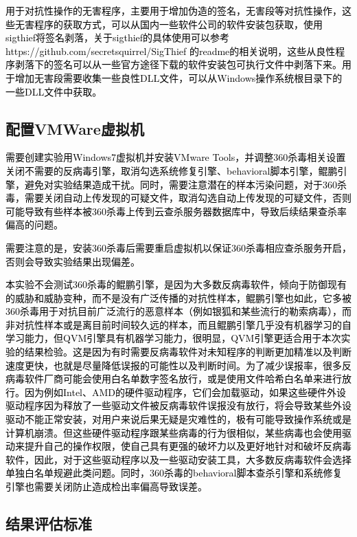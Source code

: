 \textcolor{black}{用于对抗性操作的无害程序，主要用于增加伪造的签名，无害段等对抗性操作，这些无害程序的获取方式，可以从国内一些软件公司的软件安装包获取，使用sigthief将签名剥落，关于sigthief的具体使用可以参考https://github.com/secretsquirrel/SigThief 的readme的相关说明，这些从良性程序剥落下的签名可以从一些官方途径下载的软件安装包可执行文件中剥落下来。用于增加无害段需要收集一些良性DLL文件，可以从Windows操作系统根目录下的一些DLL文件中获取。}

\subsection{配置VMWare虚拟机}

\textcolor{black}{需要创建实验用Windows7虚拟机并安装VMware Tools，并调整360杀毒相关设置关闭不需要的反病毒引擎，取消勾选系统修复引擎、behavioral脚本引擎，鲲鹏引擎，避免对实验结果造成干扰。同时，需要注意潜在的样本污染问题，对于360杀毒，需要关闭自动上传发现的可疑文件，取消勾选自动上传发现的可疑文件，否则可能导致有些样本被360杀毒上传到云查杀服务器数据库中，导致后续结果查杀率偏高的问题。}

\textcolor{black}{需要注意的是，安装360杀毒后需要重启虚拟机以保证360杀毒相应查杀服务开启，否则会导致实验结果出现偏差。}

\textcolor{black}{本实验不会测试360杀毒的鲲鹏引擎，是因为大多数反病毒软件，倾向于防御现有的威胁和威胁变种，而不是没有广泛传播的对抗性样本，鲲鹏引擎也如此，它多被360杀毒用于对抗目前广泛流行的恶意样本（例如银狐和某些流行的勒索病毒），而非对抗性样本或是离目前时间较久远的样本，而且鲲鹏引擎几乎没有机器学习的自学习能力，但QVM引擎具有机器学习能力，很明显，QVM引擎更适合用于本次实验的结果检验。这是因为有时需要反病毒软件对未知程序的判断更加精准以及判断速度更快，也就是尽量降低误报的可能性以及判断时间。为了减少误报率，很多反病毒软件厂商可能会使用白名单数字签名放行，或是使用文件哈希白名单来进行放行。因为例如Intel、AMD的硬件驱动程序，它们会加载驱动，如果这些硬件外设驱动程序因为释放了一些驱动文件被反病毒软件误报没有放行，将会导致某些外设驱动不能正常安装，对用户来说后果无疑是灾难性的，极有可能导致操作系统或是计算机崩溃。但这些硬件驱动程序跟某些病毒的行为很相似，某些病毒也会使用驱动来提升自己的操作权限，使自己具有更强的破坏力以及更好地针对和破坏反病毒软件，因此，对于这些驱动程序以及一些驱动安装工具，大多数反病毒软件会选择单独白名单规避此类问题。同时，360杀毒的behavioral脚本查杀引擎和系统修复引擎也需要关闭防止造成检出率偏高导致误差。}

\subsection{结果评估标准}

